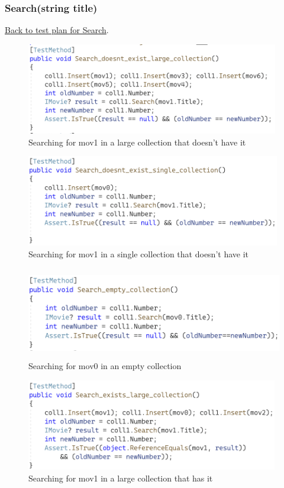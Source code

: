 \documentclass[a4paper]{article}
\begin{document}
\subsubsection{Search{(string title)}}
\hyperlink{subsubsection.3.2.4}{Back to test plan for Search}.
\begin{figure}[H]
    \includegraphics[height=4cm]{data/Search_doesnt_exist_large_collection.png}
    \caption{Searching for mov1 in a large collection that doesn't have it}
\end{figure}
\begin{figure}[H]
    \includegraphics[height=4cm]{data/Search_doesnt_exist_single_collection.png}
    \caption{Searching for mov1 in a single collection that doesn't have it}
\end{figure}
\begin{figure}[H]
    \includegraphics[height=4cm]{data/Search_empty_collection.png}
    \caption{Searching for mov0 in an empty collection}
\end{figure}
\begin{figure}[H]
    \includegraphics[height=4cm]{data/Search_exists_large_collection.png}
    \caption{Searching for mov1 in a large collection that has it}
\end{figure}
\end{document}
